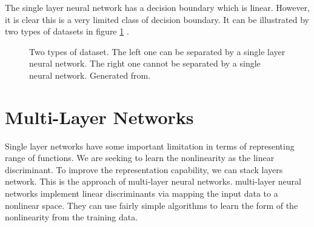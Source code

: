 The single layer neural network has a decision boundary which is linear. However, it is clear this is a very limited class of decision boundary. It can be illustrated by two types of datasets in figure \ref{fig:1Layer2datasets} .
\graphicspath{ {./Figures/} }
\begin{figure}[!htb]
\centering     %
{}
\caption{\label{fig:1Layer2datasets}Two types of dataset. The left one can be separated by a single layer neural network. The right one cannot be separated by a single neural network. Generated from\citep{GenerateNN}.}
\end{figure}

\section{Multi-Layer Networks}

Single layer networks have some important limitation in terms of representing range of functions. We are seeking to learn the nonlinearity as the linear discriminant. To improve the representation capability, we can stack layers network. This is the approach of multi-layer neural networks. multi-layer neural networks implement linear discriminants via mapping the input data to a nonlinear space. They can use fairly simple algorithms to learn the form of the nonlinearity from the training data.

